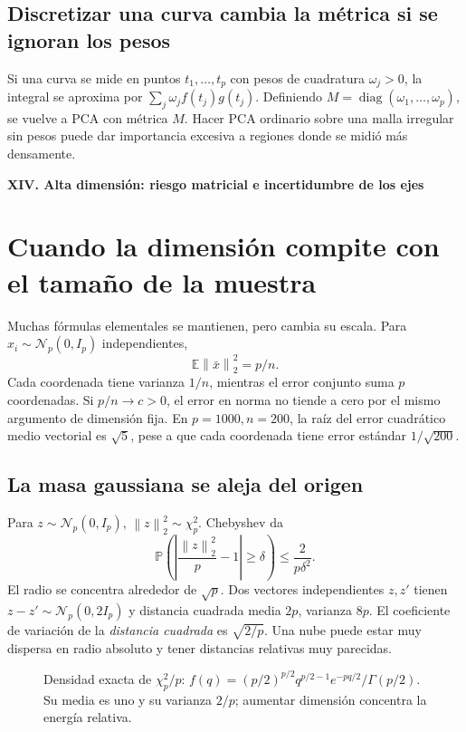 \documentclass[11pt,a4paper]{article}
\newcommand{\E}{\mathbb E}
\newcommand{\Prob}{\mathbb P}
\newcommand{\norm}[1]{\left\lVert #1\right\rVert}
\DeclareMathOperator{\diag}{diag}
\theoremstyle{definition}
\newcommand{\parte}[1]{\par\bigskip\Needspace{8\baselineskip}\begin{center}{\Large\bfseries\color{azul}#1}\end{center}}
\begin{document}
\subsection{Discretizar una curva cambia la métrica si se ignoran los pesos}
Si una curva se mide en puntos $t_1,\ldots,t_p$ con pesos de cuadratura $\omega_j>0$, la integral se aproxima por $\sum_j\omega_jf(t_j)g(t_j)$. Definiendo $M=\diag(\omega_1,\ldots,\omega_p)$, se vuelve a PCA con métrica $M$. Hacer PCA ordinario sobre una malla irregular sin pesos puede dar importancia excesiva a regiones donde se midió más densamente.

\parte{XIV. Alta dimensión: riesgo matricial e incertidumbre de los ejes}
\section{Cuando la dimensión compite con el tamaño de la muestra}
Muchas fórmulas elementales se mantienen, pero cambia su escala. Para $x_i\sim\mathcal N_p(0,I_p)$ independientes,
\[
\E\norm{\bar x}_2^2=p/n.
\]
Cada coordenada tiene varianza $1/n$, mientras el error conjunto suma $p$ coordenadas. Si $p/n\to c>0$, el error en norma no tiende a cero por el mismo argumento de dimensión fija. En $p=1000,n=200$, la raíz del error cuadrático medio vectorial es $\sqrt5$, pese a que cada coordenada tiene error estándar $1/\sqrt{200}$.
\subsection{La masa gaussiana se aleja del origen}
Para $z\sim\mathcal N_p(0,I_p)$, $\norm z_2^2\sim\chi^2_p$. Chebyshev da
\[
\Prob\!\left(\left|\frac{\norm z_2^2}p-1\right|\ge\delta\right)
\le\frac2{p\delta^2}.
\]
El radio se concentra alrededor de $\sqrt p$. Dos vectores independientes $z,z'$ tienen $z-z'\sim\mathcal N_p(0,2I_p)$ y distancia cuadrada media $2p$, varianza $8p$. El coeficiente de variación de la \emph{distancia cuadrada} es $\sqrt{2/p}$. Una nube puede estar muy dispersa en radio absoluto y tener distancias relativas muy parecidas.

\begin{figure}[H]\centering
{}
\caption{Densidad exacta de $\chi_p^2/p$: $f(q)=(p/2)^{p/2}q^{p/2-1}e^{-pq/2}/\Gamma(p/2)$. Su media es uno y su varianza $2/p$; aumentar dimensión concentra la energía relativa.}
\end{figure}
\end{document}
